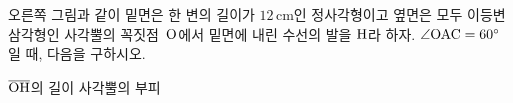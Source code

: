 \noindent\begin{minipage}[t]{0.58\linewidth}\vspace{0pt}\raggedright 오른쪽 그림과 같이 밑면은 한 변의 길이가 $12\,\mathrm{cm}$인 정사각형이고 옆면은 모두 이등변삼각형인 사각뿔의 꼭짓점~$\mathrm{O}$에서 밑면에 내린 수선의 발을 $\mathrm{H}$라 하자. $\angle\mathrm{OAC}=60^\circ$일 때, 다음을 구하시오.\end{minipage}\hfill\begin{minipage}[t]{0.4\linewidth}\vspace{0pt}\centering \resizebox{\ifdim\width>\linewidth\linewidth\else\width\fi}{!}{}\end{minipage}\par
{} $\overline{\mathrm{OH}}$의 길이
 사각뿔의 부피
